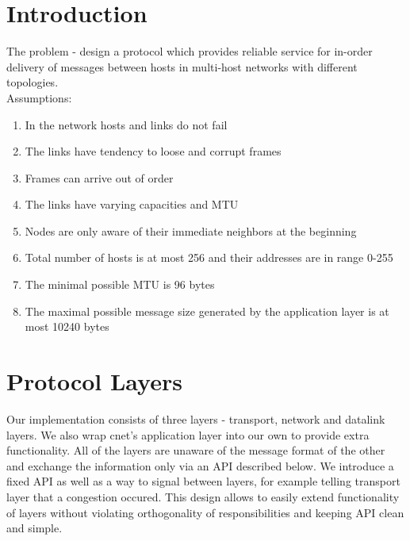 \documentclass[11pt,a4paper,oneside]{report}
\begin{document}
\lstset{language=C}
\setcounter{secnumdepth}{1}


\title{}
\author{Group 7: \\ Igor Stassiy, Kirill Afanasev,Sanjar Karaev}
\date{\today}
\maketitle

\section*{Introduction}

  The problem - design a protocol which provides reliable service for in-order
  delivery of messages between hosts in multi-host networks with
  different topologies.  \\
  
  Assumptions:
  \begin{enumerate}
    \item In the network hosts and links do not fail
    \item The links have tendency to loose and corrupt frames
    \item Frames can arrive out of order
    \item The links have varying capacities and MTU
    \item Nodes are only aware of their immediate neighbors at the beginning
    \item Total number of hosts is at most 256 and their addresses are in range
    0-255
    \item The minimal possible MTU is 96 bytes
    \item The maximal possible message size generated by the application layer 
    is at most 10240 bytes 
  \end{enumerate}
  
\section*{Protocol Layers}
Our implementation consists of three layers - transport, network
and datalink layers. We also wrap cnet's application layer into our own to
provide extra functionality. All of the layers are unaware of the message format
of the other and exchange the information only via an API described below. 
We introduce a fixed API as well as a way to signal between layers, for example telling 
transport layer that a congestion occured. This design allows to
easily extend functionality of layers without violating orthogonality of
responsibilities and keeping API clean and simple.
\end{document}
